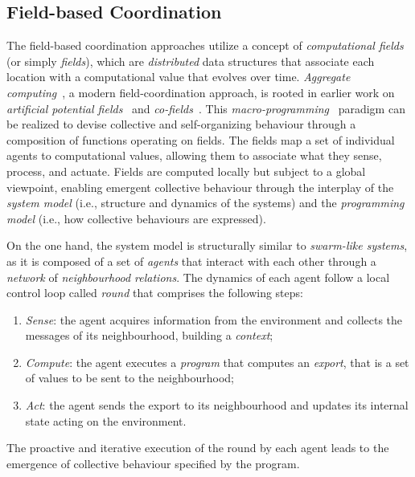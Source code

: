 \subsection{Field-based Coordination}
The field-based coordination approaches utilize a concept of \emph{computational fields} 
 (or simply \emph{fields}), 
 which are \emph{distributed} data structures that associate each location with a computational value that evolves over time. 
%
\emph{Aggregate computing}~\cite{Beal2015Computer}, a modern field-coordination approach, is rooted in earlier work on \emph{artificial potential fields}~\cite{DBLP:conf/icra/Warren89} and \emph{co-fields}~\cite{DBLP:journals/pervasive/MameiZL04}. 
% 
This \emph{macro-programming}~\cite{DBLP:journals/corr/abs-2201-03473} paradigm can be realized to devise collective and self-organizing behaviour through a composition of functions operating on fields. 
%
The fields map a set of individual agents to computational values, 
 allowing them to associate what they sense, process, and actuate. 
%
Fields are computed locally but subject to a global viewpoint, 
 enabling emergent collective behaviour through the interplay of the \emph{system model} (i.e., structure and dynamics of the systems)
 and the \emph{programming model} (i.e., how collective behaviours are expressed).

On the one hand, the system model is structurally similar to \emph{swarm-like systems}, 
 as it is composed of a set of \emph{agents} 
 that interact with each other through a \emph{network} of \emph{neighbourhood relations}.
%
The dynamics of each agent follow a local control loop called \emph{round}
 that comprises the following steps:
\begin{enumerate}
  \item \emph{Sense}: the agent acquires information from the environment and collects the messages of its neighbourhood, building a \emph{context};
  \item \emph{Compute}: the agent executes a \emph{program} that computes an \emph{export}, that is a set of values to be sent to the neighbourhood;
  \item \emph{Act}: the agent sends the export to its neighbourhood and updates its internal state acting on the environment.
\end{enumerate}
The proactive and iterative execution of the round by each agent leads to the emergence of collective behaviour specified by the program.

